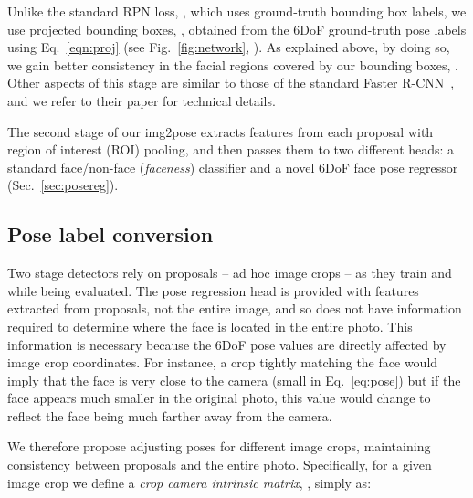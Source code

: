 \documentclass[final]{cvpr}
\begin{document}
\begin{figure*}[ht]
\end{figure*}

Unlike the standard RPN loss, , which uses ground-truth bounding box labels, we use projected bounding boxes, , obtained from the 6DoF ground-truth pose labels using Eq.~\eqref{eqn:proj} (see Fig.~\ref{fig:network}, ). As explained above, by doing so, we gain better consistency in the facial regions covered by our bounding boxes, . Other aspects of this stage are similar to those of the standard Faster R-CNN~\cite{faster_rcnn}, and we refer to their paper for technical details.

The second stage of our img2pose extracts features from each proposal with region of interest (ROI) pooling, and then passes them to two different heads: a standard face/non-face ({\em faceness}) classifier and a novel 6DoF face pose regressor (Sec.~\ref{sec:posereg}). 


\subsection{Pose label conversion}
\label{sec:pose_conversion}
Two stage detectors rely on proposals -- ad hoc image crops -- as they train and while being evaluated. The pose regression head is provided with features extracted from proposals, not the entire image, and so does not have information required to determine where the face is located in the entire photo. This information is necessary because the 6DoF pose values are directly affected by image crop coordinates. For instance, a crop tightly matching the face would imply that the face is very close to the camera (small  in Eq.~\eqref{eq:pose}) but if the face appears much smaller in the original photo, this value would change to reflect the face being much farther away from the camera.   

We therefore propose adjusting poses for different image crops, maintaining consistency between proposals and the entire photo. Specifically, for a given image crop we define a {\em crop camera intrinsic matrix}, , simply as:
\end{document}
